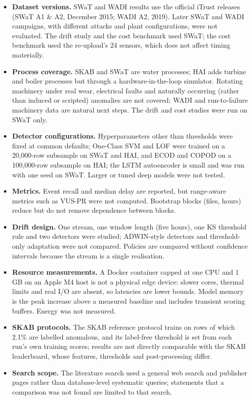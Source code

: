 \documentclass[11pt]{article}
\begin{document}
\begin{itemize}
\item \textbf{Dataset versions.} SWaT and WADI results use the official iTrust releases
(SWaT A1 \& A2, December 2015; WADI A2, 2019). Later SWaT and WADI campaigns, with
different attacks and plant configurations, were not evaluated. The drift study and the
cost benchmark used SWaT; the cost benchmark used the re-upload's 24 sensors, which does
not affect timing materially.
\item \textbf{Process coverage.} SKAB and SWaT are water processes; HAI adds
turbine and boiler processes but through a hardware-in-the-loop simulator. Rotating
machinery under real wear, electrical faults and naturally occurring (rather than
induced or scripted) anomalies are not covered; WADI \citep{ahmed2017} and run-to-failure
machinery data are natural next steps. The drift and cost studies were run on SWaT
only.
\item \textbf{Detector configurations.} Hyperparameters other than thresholds were
fixed at common defaults; One-Class SVM and LOF were trained on a 20{,}000-row
subsample on SWaT and HAI, and ECOD and COPOD on a 100{,}000-row subsample on HAI; the LSTM autoencoder is small and was run with one seed on
SWaT. Larger or tuned deep models were not tested.
\item \textbf{Metrics.} Event recall and median delay are reported, but
range-aware metrics such as VUS-PR \citep{paparrizos2022} were not computed.
Bootstrap blocks (files, hours) reduce but do not remove dependence between blocks.
\item \textbf{Drift design.} One stream, one window length (five hours), one KS
threshold rule and two detectors were studied; ADWIN-style detectors and threshold-only
adaptation were not compared. Policies are compared without confidence intervals
because the stream is a single realisation.
\item \textbf{Resource measurements.} A Docker container capped at one CPU and
1\,GB on an Apple M4 host is not a physical edge device: slower cores, thermal
limits and real I/O are absent, so latencies are lower bounds. Model memory is the peak
increase above a measured baseline and includes transient scoring buffers. Energy was not measured.
\item \textbf{SKAB protocols.} The SKAB reference protocol trains on rows of which
2.1\% are labelled anomalous, and its label-free threshold is set from each
run's own training scores; results are not directly comparable with the SKAB
leaderboard, whose features, thresholds and post-processing differ.
\item \textbf{Search scope.} The literature search used a general web search and
publisher pages rather than database-level systematic queries; statements that a
comparison was not found are limited to that search.
\end{itemize}
\end{document}
